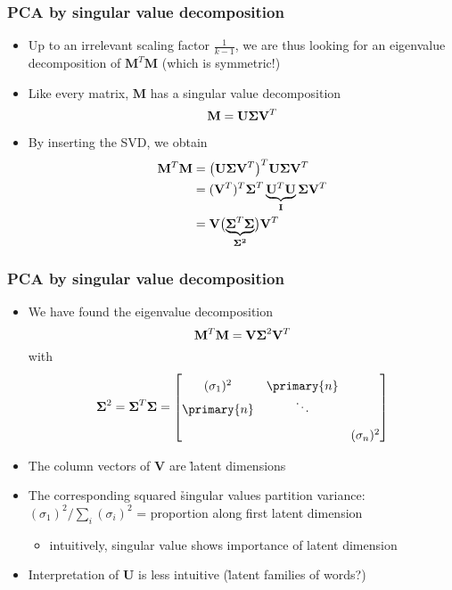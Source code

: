 \begin{frame}
  \frametitle{PCA by singular value decomposition}
  \begin{itemize}
  \item Up to an irrelevant scaling factor $\tfrac{1}{k-1}$, we are thus
    looking for an eigenvalue decomposition of $\mathbf{M}^T \mathbf{M}$
    (which is symmetric!)
  \item Like every matrix, $\mathbf{M}$ has a singular value decomposition
    \[
    \mathbf{M} = \mathbf{U} \boldsymbol{\Sigma} \mathbf{V}^T
    \]
  \item By inserting the SVD, we obtain
    \begin{align*}
      \mathbf{M}^T \mathbf{M}
      &= \bigl(\mathbf{U} \boldsymbol{\Sigma} \mathbf{V}^T\bigr)^T
      \mathbf{U} \boldsymbol{\Sigma} \mathbf{V}^T
      \\
      &= (\mathbf{V}^T)^T \boldsymbol{\Sigma}^T 
      \underbrace{ \mathbf{U}^T \mathbf{U} }_{\mathbf{I}}
      \boldsymbol{\Sigma} \mathbf{V}^T
      \\
      &= \mathbf{V} \bigl( 
      \underbrace{ \boldsymbol{\Sigma}^T \boldsymbol{\Sigma} }_{\mathbf{\boldsymbol{\Sigma}^2}}
      \bigr) \mathbf{V}^T
    \end{align*}
  \end{itemize}
\end{frame}

\begin{frame}
  \frametitle{PCA by singular value decomposition}
  \begin{itemize}
  \item We have found the eigenvalue decomposition
    \[
    \mathbf{M}^T \mathbf{M} = \mathbf{V} \boldsymbol{\Sigma}^2 \mathbf{V}^T
    \]
    with
    \[
    \Msigma^2 = \Msigma^T \Msigma
    =
    \begin{bmatrix}
      (\sigma_1)^2 & \primary{n} & \rule{0mm}{5mm} \\
      \primary{n} & \ddots & \rule{0mm}{5mm} \\
      \rule{0mm}{6mm} & & (\sigma_n)^2 
    \end{bmatrix}
    \]
  \item<2-> The column vectors of $\mathbf{V}$ are \h{latent dimensions}
  \item<3-> The corresponding squared \h{singular values} partition variance:
    $(\sigma_1)^2 / \sum_i (\sigma_i)^2$ = proportion along first latent
    dimension
    \begin{itemize}
    \item[\hand] intuitively, singular value shows importance of latent dimension
    \end{itemize}
  \item<4-> Interpretation of $\mathbf{U}$ is less intuitive (\h{latent families}
    of words?)
  \end{itemize}
\end{frame}

